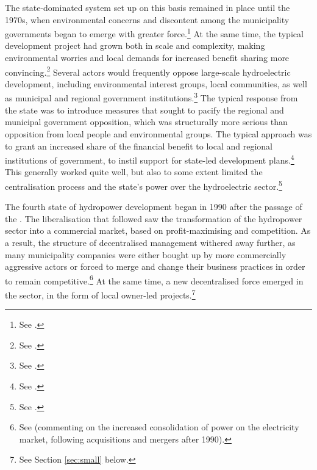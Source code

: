 The state-dominated system set up on this 
basis remained in place until the 1970s, when environmental concerns and discontent among the municipality governments began to emerge with greater force.\footnote{See \cite[71-75]{thue96}.} At the same time, the typical development project had grown both in scale and complexity, making environmental worries and local demands for increased benefit sharing more convincing.\footnote{See \cite[73]{thue96}.} Several actors would frequently oppose large-scale hydroelectric development, including environmental interest groups, local communities, as well as municipal and regional government institutions.\footnote{See \cite[71-72]{thue96}.} The typical response from the state was to introduce measures that sought to pacify the regional and municipal government opposition, which was structurally more serious than opposition from local people and environmental groups. The typical approach was to grant an increased share of the financial benefit to local and regional institutions of government, to instil support for state-led development plans.\footnote{See \cite[73-76]{nilsen08}.} This generally worked quite well, but also to some extent limited the centralisation process and the state's power over the hydroelectric sector.\footnote{See \cite[85]{thue96}.}

The fourth state of hydropower development began in 1990 after the passage of the \cite{ea90}. The liberalisation that followed saw the transformation of the hydropower sector into a commercial market, based on profit-maximising and competition. As a result, the structure of decentralised management withered away further, as many municipality companies were either bought up by more commercially aggressive actors or forced to merge and change their business practices in order to remain competitive.\footnote{See \cite[583]{bibow03} (commenting on the increased consolidation of power on the electricity market, following acquisitions and mergers after 1990).} At the same time, a new decentralised force emerged in the sector, in the form of local owner-led projects.\footnote{See Section \ref{sec:small} below.}


